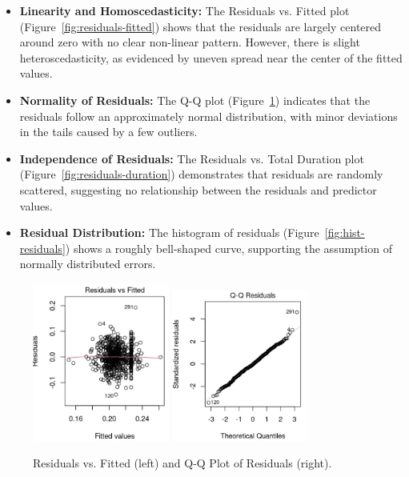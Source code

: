 \documentclass{article}
\begin{document}
\begin{itemize}
    \item \textbf{Linearity and Homoscedasticity:}  
    The Residuals vs. Fitted plot (Figure~\ref{fig:residuals-fitted}) shows that the residuals are largely centered around zero with no clear non-linear pattern. However, there is slight heteroscedasticity, as evidenced by uneven spread near the center of the fitted values.

    \item \textbf{Normality of Residuals:}  
    The Q-Q plot (Figure~\ref{fig:qq-residuals}) indicates that the residuals follow an approximately normal distribution, with minor deviations in the tails caused by a few outliers.

    \item \textbf{Independence of Residuals:}  
    The Residuals vs. Total Duration plot (Figure~\ref{fig:residuals-duration}) demonstrates that residuals are randomly scattered, suggesting no relationship between the residuals and predictor values.

    \item \textbf{Residual Distribution:}  
    The histogram of residuals (Figure~\ref{fig:hist-residuals}) shows a roughly bell-shaped curve, supporting the assumption of normally distributed errors.

\end{itemize}

\begin{figure}[h!]
  \centering
  \includegraphics[width=0.4\textwidth]{images/residuals_vs_fitted.png}
  \includegraphics[width=0.4\textwidth]{images/qq_residuals.png}
  \caption{Residuals vs. Fitted (left) and Q-Q Plot of Residuals (right).}
  \label{fig:residuals-fitted}
  \label{fig:qq-residuals}
\end{figure}
\end{document}
